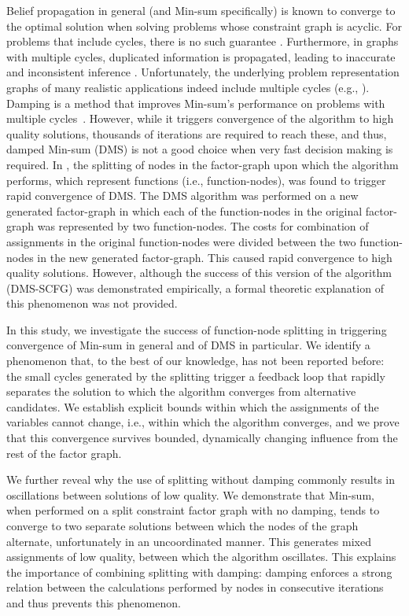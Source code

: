 	Belief propagation in general (and Min-sum specifically) is known to converge to the optimal solution when solving problems whose constraint graph is acyclic. For problems that include cycles, there is no such guarantee \cite{YanoverMW06,FarinelliRPJ08}.  Furthermore, in graphs with multiple cycles, duplicated information is propagated, leading to inaccurate and inconsistent inference \cite{Pearl88}.  Unfortunately, the underlying problem representation graphs of many realistic applications indeed include multiple cycles (e.g., \citet{ModiSTY05,GershmanMZ09}). Damping is a method that improves Min-sum's performance on problems with multiple cycles~\cite{CohenGZ20,ZaedLZ25}. However, while it triggers convergence of the algorithm to high quality solutions, thousands of iterations are required to reach these, and thus, damped Min-sum (DMS) is not a good choice when very fast decision making is required.
In \citet{CohenGZ20}, the splitting of nodes in the factor-graph upon which the algorithm performs, which represent functions (i.e., function-nodes), was found to trigger rapid convergence of DMS. The DMS algorithm was performed on a new generated factor-graph in which each of the function-nodes in the original factor-graph was represented by two function-nodes. The costs for combination of assignments in the original function-nodes were divided between the two function-nodes in the new generated factor-graph. This caused rapid convergence to high quality solutions. However, although the success of this version of the algorithm (DMS-SCFG) was demonstrated empirically, a formal theoretic explanation of this phenomenon was not provided.

In this study, we investigate the success of function-node splitting in triggering convergence of Min-sum in general and of DMS in particular. We identify a phenomenon that, to the best of our knowledge, has not been reported before: the small cycles generated by the splitting trigger a feedback loop that rapidly separates the solution to which the algorithm converges from alternative candidates. We establish explicit bounds within which the assignments of the variables cannot change, i.e., within which the algorithm converges, and we prove that this convergence survives bounded, dynamically changing influence from the rest of the factor graph.

We further reveal why the use of splitting without damping commonly results in oscillations between solutions of low quality. We demonstrate that Min-sum, when performed on a split constraint factor graph with no damping, tends to converge to two separate solutions between which the nodes of the graph alternate, unfortunately in an uncoordinated manner. This generates mixed assignments of low quality, between which the algorithm oscillates. This explains the importance of combining splitting with damping: damping enforces a strong relation between the calculations performed by nodes in consecutive iterations and thus prevents this phenomenon.

